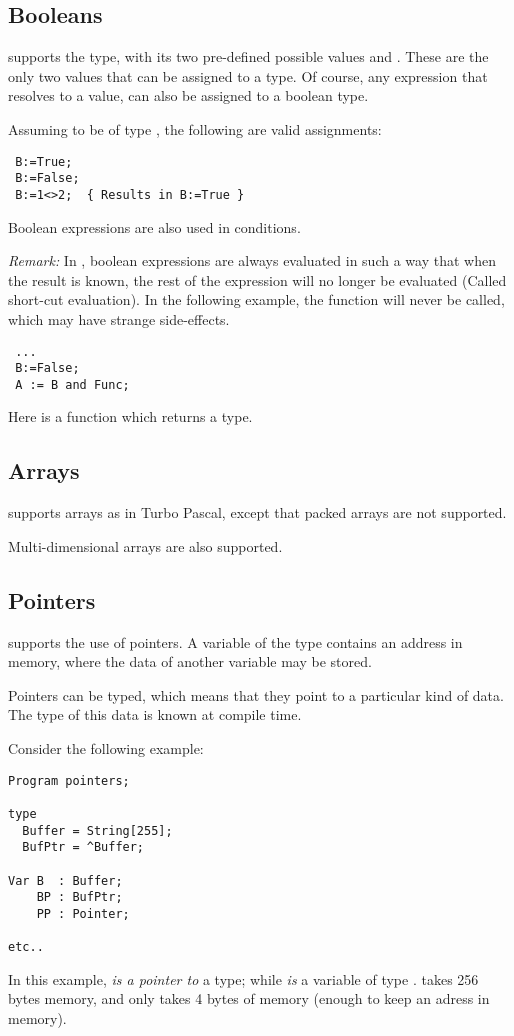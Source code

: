 \documentclass{report}
\begin{document}
\subsection{Booleans}
\fpk supports the  type, with its two pre-defined possible
values  and . These are the only two values that can be
assigned to a  type. Of course, any expression that resolves
to a  value, can also be assigned to a boolean type.

Assuming  to be of type , the following are valid
assignments:
\begin{verbatim}
 B:=True;
 B:=False;
 B:=1<>2;  { Results in B:=True }
\end{verbatim}
Boolean expressions are also used in conditions.

{\em Remark:} In \fpk, boolean expressions are always evaluated in such a
way that when the result is known, the rest of the expression will no longer
be evaluated (Called short-cut evaluation). In the following example, the function  will never
be called, which may have strange side-effects.
\begin{verbatim}
 ...
 B:=False;
 A := B and Func;
\end{verbatim} 
Here  is a function which returns a  type.

\subsection{Arrays}
\fpk supports arrays as in Turbo Pascal, except that packed arrays are not
supported. 

Multi-dimensional arrays are also supported.

\subsection{Pointers}
\fpk supports the use of pointers. A variable of the type 
contains an address in memory, where the data of another variable may be 
stored.

Pointers can be typed, which means that they point to a particular kind of
data. The type of this data is known at compile time.

Consider the following example:
\begin{CodEx}
\begin{verbatim}
Program pointers;

type 
  Buffer = String[255];
  BufPtr = ^Buffer;

Var B  : Buffer;
    BP : BufPtr;
    PP : Pointer;

etc..
\end{verbatim}
\end{CodEx}
In this example,  {\em is a pointer to} a  type; while 
{\em is} a variable of type .  takes 256 bytes memory,
and  only takes 4 bytes of memory (enough to keep an adress in
memory).
\end{document}
